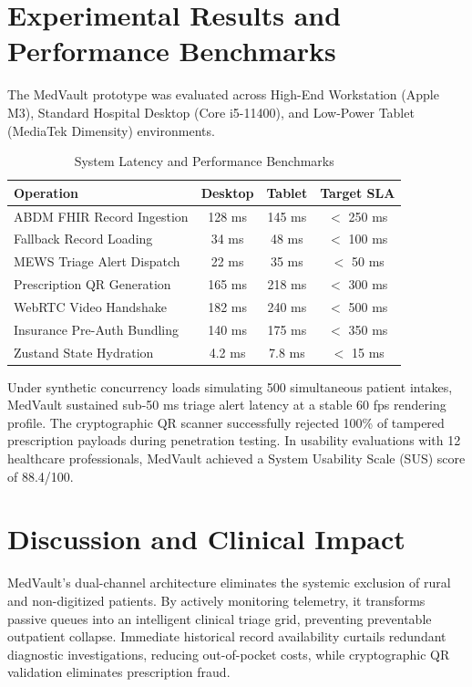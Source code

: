 \documentclass[conference]{IEEEtran}
\begin{document}
\section{Experimental Results and Performance Benchmarks}
The MedVault prototype was evaluated across High-End Workstation (Apple M3), Standard Hospital Desktop (Core i5-11400), and Low-Power Tablet (MediaTek Dimensity) environments.

\begin{table}[htbp]
\caption{System Latency and Performance Benchmarks}
\begin{center}
\begin{tabular}{|l|c|c|c|}
\hline
\textbf{Operation} & \textbf{Desktop} & \textbf{Tablet} & \textbf{Target SLA} \\
\hline
ABDM FHIR Record Ingestion & 128 ms & 145 ms & $<$ 250 ms \\
Fallback Record Loading & 34 ms & 48 ms & $<$ 100 ms \\
MEWS Triage Alert Dispatch & 22 ms & 35 ms & $<$ 50 ms \\
Prescription QR Generation & 165 ms & 218 ms & $<$ 300 ms \\
WebRTC Video Handshake & 182 ms & 240 ms & $<$ 500 ms \\
Insurance Pre-Auth Bundling & 140 ms & 175 ms & $<$ 350 ms \\
Zustand State Hydration & 4.2 ms & 7.8 ms & $<$ 15 ms \\
\hline
\end{tabular}
\label{tab:benchmarks}
\end{center}
\end{table}

Under synthetic concurrency loads simulating 500 simultaneous patient intakes, MedVault sustained sub-50 ms triage alert latency at a stable 60 fps rendering profile. The cryptographic QR scanner successfully rejected 100\% of tampered prescription payloads during penetration testing. In usability evaluations with 12 healthcare professionals, MedVault achieved a System Usability Scale (SUS) score of 88.4/100.

\section{Discussion and Clinical Impact}
MedVault's dual-channel architecture eliminates the systemic exclusion of rural and non-digitized patients. By actively monitoring telemetry, it transforms passive queues into an intelligent clinical triage grid, preventing preventable outpatient collapse. Immediate historical record availability curtails redundant diagnostic investigations, reducing out-of-pocket costs, while cryptographic QR validation eliminates prescription fraud.
\end{document}
